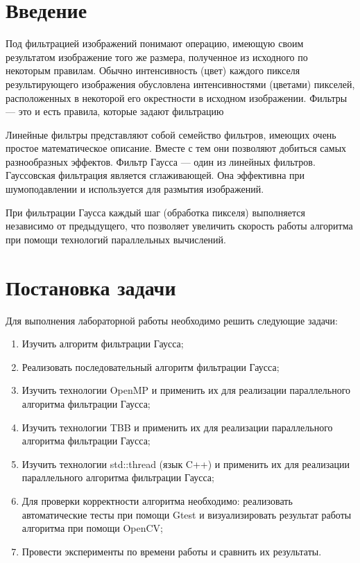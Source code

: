 \documentclass{report}
\begin{document}

	\renewcommand\contentsname{\Large{Содержание}}
	\renewcommand\thechapter{\arabic{chapter}}
	\setcounter{page}{2}
	\tableofcontents
	\newpage


	\section*{Введение}

	\par Под фильтрацией изображений понимают операцию, имеющую своим результатом изображение того же размера, полученное из исходного по некоторым правилам. Обычно интенсивность (цвет) каждого пикселя результирующего изображения обусловлена интенсивностями (цветами) пикселей, расположенных в некоторой его окрестности в исходном изображении. Фильтры — это и есть правила, которые задают фильтрацию
	\par Линейные фильтры представляют собой семейство фильтров, имеющих очень простое математическое описание. Вместе с тем они позволяют добиться самых разнообразных эффектов. Фильтр Гаусса — один из линейных фильтров. Гауссовская фильтрация является сглаживающей. Она эффективна при шумоподавлении и используется для размытия изображений.
	\par При фильтрации Гаусса каждый шаг (обработка пикселя) выполняется независимо от предыдущего, что позволяет увеличить скорость работы алгоритма при помощи технологий параллельных вычислений.

	\newpage


	\section*{Постановка задачи}

	\par Для выполнения лабораторной работы необходимо решить следующие задачи:

	\begin{enumerate}
		\item Изучить алгоритм фильтрации Гаусса;
		\item Реализовать последовательный алгоритм фильтрации Гаусса;
		\item Изучить технологии OpenMP и применить их для реализации параллельного алгоритма фильтрации Гаусса;
		\item Изучить технологии TBB и применить их для реализации параллельного алгоритма фильтрации Гаусса;
		\item Изучить технологии std::thread (язык C++) и применить их для реализации параллельного алгоритма фильтрации Гаусса;
		\item Для проверки корректности алгоритма необходимо: реализовать автоматические тесты при помощи Gtest и визуализировать результат работы алгоритма при помощи OpenCV;
		\item Провести эксперименты по времени работы и сравнить их результаты.
	\end{enumerate}
\end{document}
